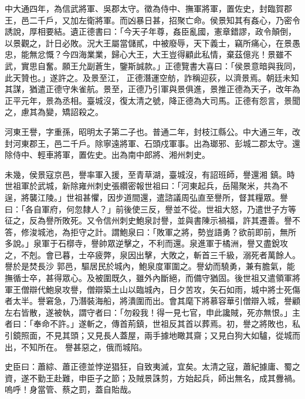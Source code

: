 \begin{pinyinscope}
 中大通四年，為信武將軍、吳郡太守。徵為侍中、撫軍將軍，置佐史，封臨賀郡王，邑二千戶，又加左衛將軍。而凶暴日甚，招聚亡命。侯景知其有姦心，乃密令誘說，厚相要結。遺正德書曰：「今天子年尊，姦臣亂國，憲章錯謬，政令顛倒，以景觀之，計日必敗。況大王屬當儲貳，中被廢辱，天下義士，竊所痛心，在景愚忠，能無忿慨？今四海業業，歸心大王，大王豈得顧此私情，棄茲億兆！景雖不武，實思自奮。願王允副蒼生，鑒斯誠款。」正德覽書大喜曰：「侯景意暗與我同，此天贊也。」遂許之。及景至江，
 正德潛運空舫，詐稱迎荻，以濟景焉。朝廷未知其謀，猶遣正德守朱雀航。景至，正德乃引軍與景俱進，景推正德為天子，改年為正平元年，景為丞相。臺城沒，復太清之號，降正德為大司馬。正德有怨言，景聞之，慮其為變，矯詔殺之。



 河東王譽，字重孫，昭明太子第二子也。普通二年，封枝江縣公。中大通三年，改封河東郡王，邑二千戶。除寧遠將軍、石頭戍軍事。出為瑯邪、彭城二郡太守。還除侍中、輕車將軍，置佐史。出為南中郎將、湘州刺史。



 未幾，侯景寇京邑，譽率軍入援，至青草湖，臺城沒，有詔班師，譽還湘
 鎮。時世祖軍於武城，新除雍州刺史張纘密報世祖曰：「河東起兵，岳陽聚米，共為不逞，將襲江陵。」世祖甚懼，因步道間還，遣諮議周弘直至譽所，督其糧眾。譽曰：「各自軍府，何忽隸人？」前後使三反，譽並不從。世祖大怒，乃遣世子方等征之，反為譽所敗死。又令信州刺史鮑泉討譽，並與書陳示禍福，許其遷善。譽不答，修浚城池，為拒守之計。謂鮑泉曰：「敗軍之將，勢豈語勇？欲前即前，無所多說。」泉軍于石槨寺，譽帥眾逆擊之，不利而還。泉進軍于橘洲，譽又盡銳攻之，不剋。會已暮，士卒疲弊，泉因出擊，大敗之，斬首三千級，溺死者萬餘人。譽於是焚長沙
 郭邑，驅居民於城內，鮑泉度軍圍之。譽幼而驍勇，兼有膽氣，能撫循士卒，甚得眾心。及被圍既久，雖外內斷絕，而備守猶固。後世祖又遣領軍將軍王僧辯代鮑泉攻譽，僧辯築土山以臨城內，日夕苦攻，矢石如雨，城中將士死傷者太半。譽窘急，乃潛裝海船，將潰圍而出。會其麾下將慕容華引僧辯入城，譽顧左右皆散，遂被執，謂守者曰：「勿殺我！得一見七官，申此讒賊，死亦無恨。」主者曰：「奉命不許。」遂斬之，傳首荊鎮，世祖反其首以葬焉。初，譽之將敗也，私引鏡照面，不見其頭；又見長人蓋屋，兩手據地瞰其齋；又見白狗大如驢，從城而出，不知所在。
 譽甚惡之，俄而城陷。



 史臣曰：蕭綜、蕭正德並悖逆猖狂，自致夷滅，宜矣。太清之寇，蕭紀據庸、蜀之資，遂不勤王赴難，申臣子之節；及賊景誅剪，方始起兵，師出無名，成其釁禍。嗚呼！身當管、蔡之罰，蓋自貽哉。



\end{pinyinscope}